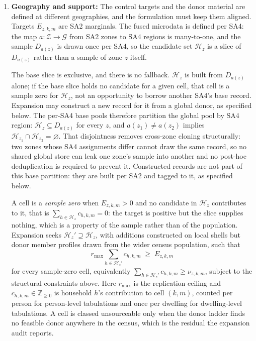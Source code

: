 \begin{enumerate}[label=\textbf{C\arabic*}, ref=C\arabic*]
    \item \textbf{Geography and support:}
    The control targets and the donor material are defined at different geographies, and the
    formulation must keep them aligned. Targets \( E_{z,k,m} \) are SA2 marginals. The fused
    microdata is defined per SA4: the map \( a: \mathcal{Z} \to \mathcal{G} \) from SA2 zones
    to SA4 regions is many-to-one, and the sample \( D_{a(z)} \) is drawn once per SA4, so the
    candidate set \( \mathcal{H}_z \) is a slice of \( D_{a(z)} \) rather than a sample of zone
    \( z \) itself.

    The base slice is exclusive, and there is no fallback. \( \mathcal{H}_z \) is built from
    \( D_{a(z)} \) alone; if the base slice holds no candidate for a given cell, that cell is
    a sample zero for \( \mathcal{H}_z \), not an opportunity to borrow another SA4's base
    record. Expansion may construct a new record for it from a global donor, as specified
    below. The per-SA4 base pools therefore partition the global pool by SA4 region:
    \( \mathcal{H}_z \subseteq D_{a(z)} \) for every \( z \), and
    \( a(z_1) \neq a(z_2) \) implies
    \( \mathcal{H}_{z_1} \cap \mathcal{H}_{z_2} = \varnothing \). That disjointness removes
    cross-zone cloning structurally: two zones whose SA4 assignments differ cannot draw the
    same record, so no shared global store can leak one zone's sample into another and no
    post-hoc deduplication is required to prevent it. Constructed records are not part of
    this base partition: they are built per SA2 and tagged to it, as specified below.

    A cell is a \emph{sample zero} when
    \( E_{z,k,m} > 0 \) and no candidate in \( \mathcal{H}_z \) contributes to it, that is
    \( \sum_{h \in \mathcal{H}_z} c_{h,k,m} = 0 \): the target is positive but the slice supplies
    nothing, which is a property of the sample rather than of the population. Expansion seeks
    \( \mathcal{H}_z' \supseteq \mathcal{H}_z \), with additions constructed on local
    shells but donor member profiles drawn from the wider census population, such
    that
    \[
      r_{\max} \sum_{h \in \mathcal{H}_z'} c_{h,k,m} \;\ge\; E_{z,k,m}
    \]
    for every sample-zero cell, equivalently
    \( \sum_{h \in \mathcal{H}_z'} c_{h,k,m} \ge \nu_{z,k,m} \), subject to the structural constraints above. Here
    \( r_{\max} \) is the replication ceiling and \( c_{h,k,m} \in \mathbb{Z}_{\ge 0} \) is
    household \( h \)'s contribution to cell \( (k,m) \), counted per person for person-level
    tabulations and once per dwelling for dwelling-level tabulations. A cell is classed
    unsourceable only when the donor ladder finds no feasible donor anywhere in the
    census, which is the residual the expansion audit reports.


\end{enumerate}
